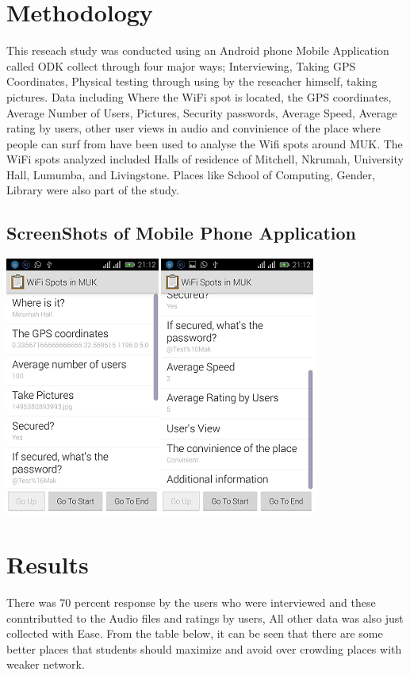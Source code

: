 \documentclass[12pt, a4paper]{article}
\begin{document}
\section{Methodology}
This reseach study was conducted using an Android phone Mobile Application called ODK collect through four major ways; Interviewing, Taking GPS Coordinates, Physical testing through using by the reseacher himself, taking pictures. Data including Where the WiFi spot is located, the GPS coordinates, Average Number of Users, Pictures, Security passwords, Average Speed, Average rating by users, other user views in audio and convinience of the place where people can surf from have been used to analyse the Wifi spots around MUK.
\newline The WiFi spots analyzed included Halls of residence of Mitchell, Nkrumah, University Hall, Lumumba, and Livingstone. Places like School of Computing, Gender, Library were also part of the study.
\subsection{ScreenShots of Mobile Phone Application}

\includegraphics{shot3}

\section{Results}
There was 70 percent response by the users who were interviewed and these conntributted to the Audio files and ratings by users, All other data was also just collected with Ease. From the table below, it can be seen that there are some better places that students should maximize and avoid over crowding places with weaker network. 
\end{document}
